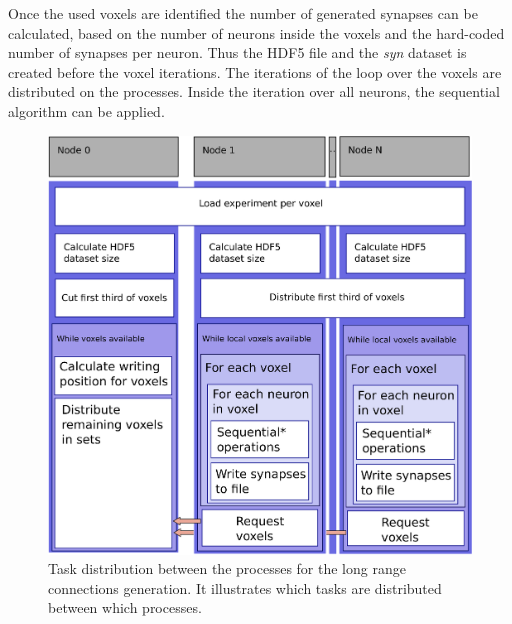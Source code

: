 Once the used voxels are identified the number of generated synapses can be calculated, based on the
number of neurons inside the voxels and the hard-coded number of synapses per neuron.
Thus the HDF5 file and the \emph{syn} dataset is created before the voxel iterations.
The iterations of the loop over the voxels are distributed on the processes.
Inside the iteration over all neurons, the sequential algorithm can be applied.
\begin{figure}[ht!]
\centering
\includegraphics[scale=0.5]{pictures/longRange_parallelAlg.eps}
\caption{Task distribution between the processes for the long range connections generation. It illustrates which tasks are distributed between which processes.}
\label{fig:longrangParallel}
\end{figure}

